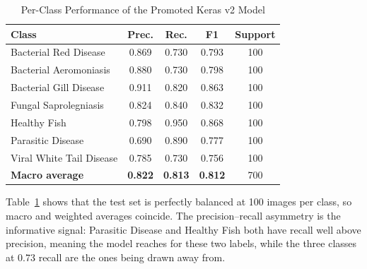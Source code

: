\documentclass[conference]{IEEEtran}
\begin{document}
\begin{table}[!t]
\caption{Per-Class Performance of the Promoted Keras v2 Model}
\centering
\scriptsize
\begin{tabular}{l c c c c}
\toprule
\textbf{Class} & \textbf{Prec.} & \textbf{Rec.} & \textbf{F1} & \textbf{Support}\\
\midrule
Bacterial Red Disease      & 0.869 & 0.730 & 0.793 & 100\\
Bacterial Aeromoniasis     & 0.880 & 0.730 & 0.798 & 100\\
Bacterial Gill Disease     & 0.911 & 0.820 & 0.863 & 100\\
Fungal Saprolegniasis      & 0.824 & 0.840 & 0.832 & 100\\
Healthy Fish               & 0.798 & 0.950 & 0.868 & 100\\
Parasitic Disease          & 0.690 & 0.890 & 0.777 & 100\\
Viral White Tail Disease   & 0.785 & 0.730 & 0.756 & 100\\
\midrule
\textbf{Macro average}     & \textbf{0.822} & \textbf{0.813} & \textbf{0.812} & 700\\
\bottomrule
\end{tabular}
\label{tab:perclass}
\end{table}

Table~\ref{tab:perclass} shows that the test set is perfectly balanced at 100 images per class, so macro and weighted averages coincide. The precision--recall asymmetry is the informative signal: Parasitic Disease and Healthy Fish both have recall well above precision, meaning the model reaches for these two labels, while the three classes at 0.73 recall are the ones being drawn away from.
\end{document}
